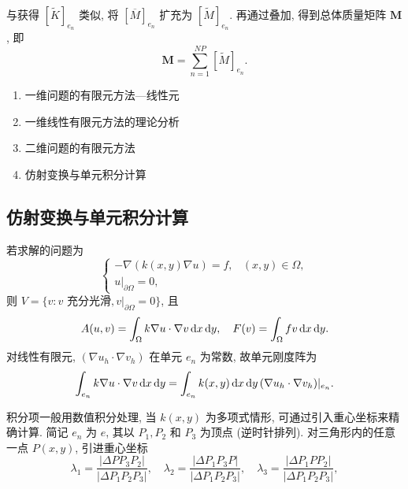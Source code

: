 与获得 $[\widetilde{K}]_{e_n}$ 类似, 将 $[\overline{M}]_{e_n}$ 扩充为 $[\widetilde{M}]_{e_n}$.
再通过叠加, 得到总体质量矩阵 $\boldsymbol{M}$, 即
\begin{equation}
\boldsymbol{M} = \sum_{n=1}^{NP} [\widetilde{M}]_{e_n}. \label{eq:3.3}
\end{equation}

\begin{enumerate}
\item 一维问题的有限元方法---线性元
\item 一维线性有限元方法的理论分析
\item 二维问题的有限元方法
\item 仿射变换与单元积分计算
\end{enumerate}

\subsection{仿射变换与单元积分计算}

若求解的问题为
\begin{equation*}
\begin{cases}
-\nabla(k(x,y)\nabla u) = f, & (x,y) \in \Omega, \\
u|_{\partial\Omega} = 0,
\end{cases}
\end{equation*}
则 $V = \{v: v \text{ 充分光滑}, v|_{\partial\Omega} = 0\}$, 且
\begin{equation*}
A(u,v) = \int_\Omega k\nabla u \cdot \nabla v \mathop{}\!\mathrm{d} x\mathop{}\!\mathrm{d} y, \quad F(v) = \int_\Omega fv \mathop{}\!\mathrm{d} x\mathop{}\!\mathrm{d} y.
\end{equation*}
对线性有限元, $(\nabla u_h \cdot \nabla v_h)$ 在单元 $e_n$ 为常数, 故单元刚度阵为
\begin{equation*}
\int_{e_n} k\nabla u \cdot \nabla v \mathop{}\!\mathrm{d} x\mathop{}\!\mathrm{d} y = \int_{e_n} k(x,y)\mathop{}\!\mathrm{d} x\mathop{}\!\mathrm{d} y\, (\nabla u_h \cdot
\nabla v_h)|_{e_n}.
\end{equation*}

积分项一般用数值积分处理, 当 $k(x,y)$ 为多项式情形, 可通过引入重心坐标来精确计算. 简记 $e_n$ 为
$e$, 其以 $P_1, P_2$ 和 $P_3$ 为顶点 (逆时针排列). 对三角形内的任意一点 $P(x,y)$, 引进重心坐标
\begin{equation*}
\lambda_1 = \frac{|\Delta PP_3P_2|}{|\Delta P_1P_2P_3|}, \quad \lambda_2 = \frac{|\Delta
P_1P_3P|}{|\Delta P_1P_2P_3|}, \quad \lambda_3 = \frac{|\Delta P_1PP_2|}{|\Delta P_1P_2P_3|},
\end{equation*}

